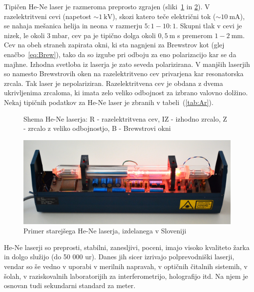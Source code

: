 Tipičen He-Ne laser je razmeroma preprosto zgrajen (sliki~\ref{fig:HeNeShema}
in \ref{fig:Iskra}).
V razelektritveni cevi (napetost  $\sim 1~\si{\kilo\volt}$), skozi
katero teče električni tok ($\sim 10~\si{\milli\ampere}$), 
se nahaja mešanica helija in neona v razmerju 
$5:1 - 10:1$. Skupni tlak v cevi je nizek, le okoli $3~\si{\milli\bar}$, 
cev pa je tipično dolga okoli $0,5~\si{\metre}$ s premerom $1-2~\si{\milli\metre}$.  
Cev na obeh straneh zapirata okni, ki sta nagnjeni za Brewstrov kot (glej enačbo~\ref{eq:Brew}), 
tako da so izgube pri odboju za eno polarizacijo kar se da majhne.
Izhodna svetloba iz laserja je zato seveda polarizirana. V manjših laserjih
so namesto Brewstrovih oken na razelektritveno cev privarjena kar
resonatorska zrcala. Tak laser je nepolariziran. 
Razelektritvena cev je obdana z dvema ukrivljenima zrcaloma, 
ki imata zelo veliko odbojnost za izbrano valovno dolžino.
Nekaj tipičnih podatkov za He-Ne laser je zbranih v tabeli~(\ref{tab:Ar}).
\begin{figure}[h]
\centering
\def\svgwidth{100truemm} 

\caption{Shema He-Ne laserja: R - razelektritvena cev, IZ - izhodno zrcalo, Z - zrcalo
z veliko odbojnostjo, B - Brewstrovi okni}
\label{fig:HeNeShema}
\end{figure}

\begin{figure}[h]
\centering
\includegraphics[width=120truemm]{slike/07_HeNe.jpg}
\caption{Primer starejšega He-Ne laserja, izdelanega v Sloveniji}
\label{fig:Iskra}
\end{figure}

He-Ne laserji so preprosti, stabilni, zanesljivi, poceni, imajo visoko kvaliteto žarka
in dolgo služijo (do 50 000 ur).
Danes jih sicer izrivajo polprevodniški laserji, vendar so še vedno v uporabi
v merilnih napravah, v optičnih čitalnih sistemih, v šolah, v raziskovalnih 
laboratorijih za interferometrijo, holografijo itd. Na njem je osnovan tudi 
sekundarni standard za meter.

